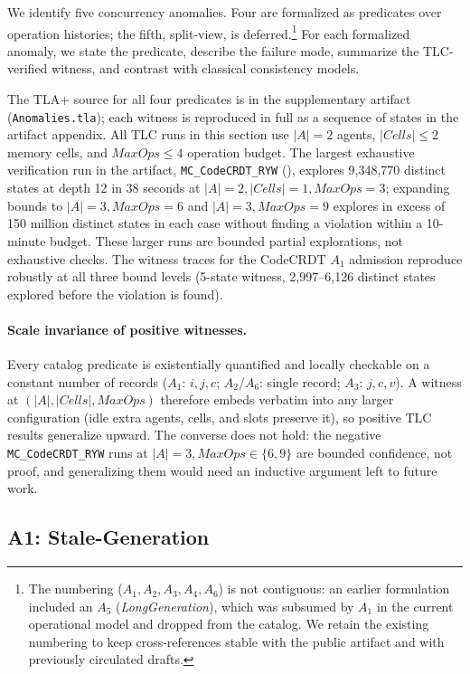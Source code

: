 \documentclass[journal,compsoc,10pt]{IEEEtran}
\theoremstyle{definition}
\theoremstyle{remark}
\newcommand{\fld}[1]{\mathit{#1}}
\begin{document}
We identify five concurrency anomalies. Four are formalized as
predicates over operation histories; the fifth, split-view, is
deferred.\footnote{The numbering ($A_1, A_2, A_3, A_4, A_6$) is
not contiguous: an earlier formulation included an $A_5$
(\emph{LongGeneration}), which was subsumed by $A_1$ in the
current operational model and dropped from the catalog. We
retain the existing numbering to keep cross-references stable
with the public artifact and with previously circulated drafts.}
For each formalized anomaly, we state the predicate,
describe the failure mode, summarize the TLC-verified witness, and
contrast with classical consistency models.

The TLA+ source for all four predicates is in the supplementary
artifact (\texttt{Anomalies.tla}); each witness is reproduced in full
as a sequence of states in the artifact appendix. All TLC runs in
this section use $|A| = 2$ agents, $|\fld{Cells}| \leq 2$ memory cells,
and $\fld{MaxOps} \leq 4$ operation budget. The largest exhaustive
verification run in the artifact, \texttt{MC\_CodeCRDT\_RYW}
(), explores 9{,}348{,}770 distinct
states at depth 12 in 38 seconds at $|A|=2, |\fld{Cells}|=1,
\fld{MaxOps}=3$; expanding bounds to $|A|=3, \fld{MaxOps}=6$
and $|A|=3, \fld{MaxOps}=9$ explores in excess of 150 million
distinct states in each case without finding a violation within a
10-minute budget. These larger runs are bounded partial explorations,
not exhaustive checks. The witness traces for the
CodeCRDT $A_1$ admission reproduce robustly at all three bound
levels (5-state witness, 2{,}997--6{,}126 distinct states explored
before the violation is found).

\paragraph{Scale invariance of positive witnesses.}
Every catalog predicate is existentially quantified and locally checkable
on a constant number of records ($A_1$: $i,j,c$; $A_2$/$A_6$: single
record; $A_3$: $j,c,v$). A witness at $(|A|,|\fld{Cells}|,\fld{MaxOps})$
therefore embeds verbatim into any larger configuration (idle extra agents,
cells, and slots preserve it), so positive TLC results generalize upward.
The converse does not hold: the negative \texttt{MC\_CodeCRDT\_RYW} runs at
$|A|=3,\fld{MaxOps}\in\{6,9\}$ are bounded confidence, not proof, and
generalizing them would need an inductive argument left to future work.

\subsection{A1: Stale-Generation}
\label{sec:a1}
\end{document}
